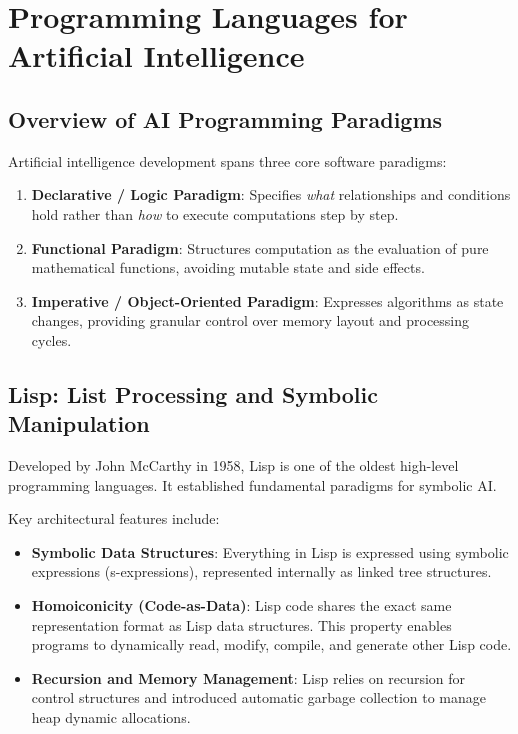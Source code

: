 \documentclass[12pt]{report}
\begin{document}
\section{Programming Languages for Artificial Intelligence}

\subsection{Overview of AI Programming Paradigms}

Artificial intelligence development spans three core software paradigms:

\begin{enumerate}
    \item \textbf{Declarative / Logic Paradigm}: Specifies \textit{what} relationships and conditions hold rather than \textit{how} to execute computations step by step.
    \item \textbf{Functional Paradigm}: Structures computation as the evaluation of pure mathematical functions, avoiding mutable state and side effects.
    \item \textbf{Imperative / Object-Oriented Paradigm}: Expresses algorithms as state changes, providing granular control over memory layout and processing cycles.
\end{enumerate}

\subsection{Lisp: List Processing and Symbolic Manipulation}

Developed by John McCarthy in 1958, Lisp is one of the oldest high-level programming languages. It established fundamental paradigms for symbolic AI.

Key architectural features include:

\begin{itemize}
    \item \textbf{Symbolic Data Structures}: Everything in Lisp is expressed using symbolic expressions (s-expressions), represented internally as linked tree structures.
    \item \textbf{Homoiconicity (Code-as-Data)}: Lisp code shares the exact same representation format as Lisp data structures. This property enables programs to dynamically read, modify, compile, and generate other Lisp code.
    \item \textbf{Recursion and Memory Management}: Lisp relies on recursion for control structures and introduced automatic garbage collection to manage heap dynamic allocations.
\end{itemize}
\end{document}
